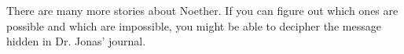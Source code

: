 
There are many more stories about Noether. If you can figure out which ones are possible and 
which are impossible, you might be able to decipher the message hidden in Dr. Jonas' journal.
